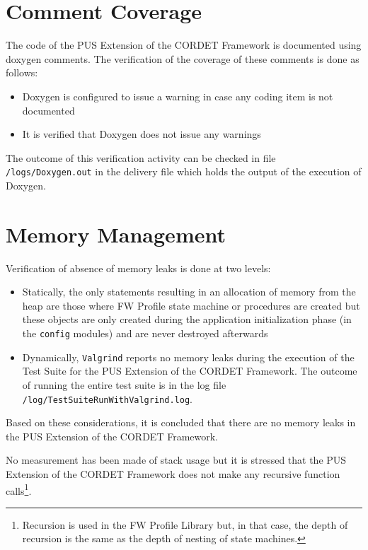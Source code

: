 \documentclass{pnp_article}
\begin{document}
\section{Comment Coverage}\label{sec:svrCommCov}
The code of the PUS Extension of the CORDET Framework is documented using doxygen comments. The verification of the coverage of these comments is done as follows:

\begin{itemize}
\item Doxygen is configured to issue a warning in case any coding item is not documented
\item It is verified that Doxygen does not issue any warnings
\end{itemize}

The outcome of this verification activity can be checked in file \texttt{/logs/Doxygen.out} in the delivery file which holds the output of the execution of Doxygen.


\section{Memory Management}\label{sec:svrMemMng}
Verification of absence of memory leaks is done at two levels:

\begin{itemize}
\item Statically, the only statements resulting in an allocation of memory from the heap are those where FW Profile state machine or procedures are created but these objects are only created during the application initialization phase (in the \texttt{config} modules) and are never destroyed afterwards
\item Dynamically, \texttt{Valgrind} reports no memory leaks during the execution of the Test Suite for the PUS Extension of the CORDET Framework. The outcome of running the entire test suite is in the log file \texttt{/log/TestSuiteRunWithValgrind.log}.
\end{itemize}

Based on these considerations, it is concluded that there are no memory leaks in the PUS Extension of the CORDET Framework.

No measurement has been made of stack usage but it is stressed that the PUS Extension of the CORDET Framework does not make any recursive function calls\footnote{Recursion is used in the FW Profile Library but, in that case, the depth of recursion is the same as the depth of nesting of state machines.}.
\end{document}
